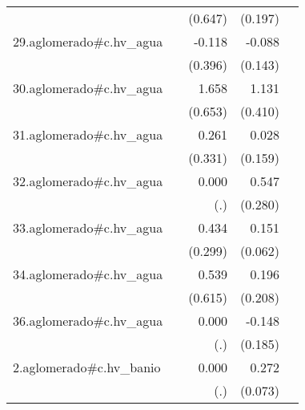{\begin{longtable}{l*{4}{D{.}{.}{-1}}}
            &                     &     (0.647)         &     (0.197)         &                     \\
\addlinespace
29.aglomerado#c.hv\_agua&                     &      -0.118         &      -0.088         &                     \\
            &                     &     (0.396)         &     (0.143)         &                     \\
\addlinespace
30.aglomerado#c.hv\_agua&                     &       1.658\sym{*}  &       1.131\sym{**} &                     \\
            &                     &     (0.653)         &     (0.410)         &                     \\
\addlinespace
31.aglomerado#c.hv\_agua&                     &       0.261         &       0.028         &                     \\
            &                     &     (0.331)         &     (0.159)         &                     \\
\addlinespace
32.aglomerado#c.hv\_agua&                     &       0.000         &       0.547         &                     \\
            &                     &         (.)         &     (0.280)         &                     \\
\addlinespace
33.aglomerado#c.hv\_agua&                     &       0.434         &       0.151\sym{*}  &                     \\
            &                     &     (0.299)         &     (0.062)         &                     \\
\addlinespace
34.aglomerado#c.hv\_agua&                     &       0.539         &       0.196         &                     \\
            &                     &     (0.615)         &     (0.208)         &                     \\
\addlinespace
36.aglomerado#c.hv\_agua&                     &       0.000         &      -0.148         &                     \\
            &                     &         (.)         &     (0.185)         &                     \\
\addlinespace
2.aglomerado#c.hv\_banio&                     &       0.000         &       0.272\sym{***}&                     \\
            &                     &         (.)         &     (0.073)         &                     \\

\end{longtable}}
